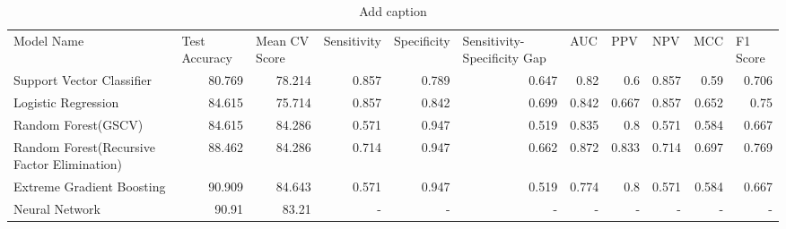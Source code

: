 \begin{table}[htbp]
  \centering
  \caption{Add caption}
    \begin{tabular}{lrrrrrrrrrr}
    Model Name & \multicolumn{1}{l}{Test Accuracy} & \multicolumn{1}{l}{Mean CV Score} & \multicolumn{1}{l}{Sensitivity} & \multicolumn{1}{l}{Specificity} & \multicolumn{1}{l}{Sensitivity-Specificity Gap} & \multicolumn{1}{l}{AUC} & \multicolumn{1}{l}{PPV} & \multicolumn{1}{l}{NPV} & \multicolumn{1}{l}{MCC} & \multicolumn{1}{l}{F1 Score} \\
    Support Vector Classifier & 80.769 & 78.214 & 0.857 & 0.789 & 0.647 & 0.82  & 0.6   & 0.857 & 0.59  & 0.706 \\
    Logistic Regression & 84.615 & 75.714 & 0.857 & 0.842 & 0.699 & 0.842 & 0.667 & 0.857 & 0.652 & 0.75 \\
    Random Forest(GSCV) & 84.615 & 84.286 & 0.571 & 0.947 & 0.519 & 0.835 & 0.8   & 0.571 & 0.584 & 0.667 \\
    Random Forest(Recursive Factor Elimination) & 88.462 & 84.286 & 0.714 & 0.947 & 0.662 & 0.872 & 0.833 & 0.714 & 0.697 & 0.769 \\
    Extreme Gradient Boosting & 90.909 & 84.643 & 0.571 & 0.947 & 0.519 & 0.774 & 0.8   & 0.571 & 0.584 & 0.667 \\
    Neural Network & 90.91 & 83.21 & -     & -     & -     & -     & -     & -     & -     & - \\
    \end{tabular}%
  \label{tab:addlabel}%
\end{table}%
